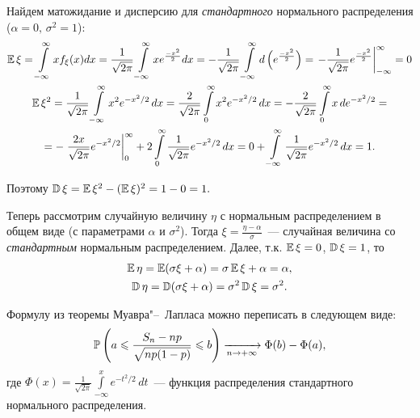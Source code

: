 Найдем матожидание и дисперсию для \textit{стандартного} нормального распределения ($\alpha = 0, \, \sigma^2 = 1$):
\begin{multline*}
    \operatorname{\mathbb{E}} \xi = 
    \int\limits_{-\infty}^{\infty} x f_{\xi}(x) dx =
    \frac{1}{\sqrt{2\pi}} \int\limits_{-\infty}^{\infty} x e^{\frac{-x^2}{2}} dx =
    -\frac{1}{\sqrt{2\pi}} \int\limits_{-\infty}^{\infty} d\left( e^{\frac{-x^2}{2}}\right) =
    \left. -\frac{1}{\sqrt{2\pi}} e^{\frac{-x^2}{2}}\right|_{-\infty}^{\infty} = 0 \\
    \operatorname{\mathbb{E}} \xi^{2}=\frac{1}{\sqrt{2 \pi}} \int\limits_{-\infty}^{\infty} x^{2} e^{-x^{2} / 2} \,d x=\frac{2}{\sqrt{2 \pi}} \int\limits_{0}^{\infty} x^{2} e^{-x^{2} / 2} \,d x=-\frac{2}{\sqrt{2 \pi}} \int\limits_{0}^{\infty} x \,d e^{-x^{2} / 2}= \\
    =-\left.\frac{2 x}{\sqrt{2 \pi}} e^{-x^{2} / 2}\right|_{0} ^{\infty}+2 \int\limits_{0}^{\infty} \frac{1}{\sqrt{2 \pi}} e^{-x^{2} / 2} \,d x=0+\int\limits_{-\infty}^{\infty} \frac{1}{\sqrt{2 \pi}} e^{-x^{2} / 2} \,d x=1.
\end{multline*}

Поэтому $\operatorname{\mathbb{D}}\xi = \operatorname{\mathbb{E}} \xi^2 - (\operatorname{\mathbb{E}} \xi)^2 = 1 - 0 = 1.$

Теперь рассмотрим случайную величину $\eta$ с нормальным распределением в общем виде (с параметрами $\alpha$ и $\sigma^2$). Тогда $\xi = \frac{\eta - \alpha}{\sigma}$~--- случайная величина со \textit{стандартным} нормальным распределением. Далее, т.к. $\operatorname{\mathbb{E}} \xi = 0$, $\operatorname{\mathbb{D}}\xi = 1$, то
\begin{gather*}
    \operatorname{\mathbb{E}} \eta = \operatorname{\mathbb{E}} (\sigma \xi + \alpha) = \sigma \operatorname{\mathbb{E}} \xi + \alpha = \alpha, \\
    \operatorname{\mathbb{D}}\eta = \operatorname{\mathbb{D}}(\sigma \xi + \alpha) = \sigma^2 \operatorname{\mathbb{D}}\xi = \sigma^2.
\end{gather*}

\vspace{1cm}
\begin{rmrk}
Формулу из теоремы Муавра"--~Лапласа можно переписать в следующем виде:
\begin{equation*}
    \operatorname{\mathbb{P}}\left(a \leqslant \frac{S_{n}-n p}{\sqrt{n p(1-p)}} \leqslant b\right) \xrightarrow[n \to +\infty]{} \Phi(b) - \Phi(a),
\end{equation*}
где $\Phi(x)=\frac{1}{\sqrt{2 \pi}} \int\limits_{-\infty}^{x} e^{-t^{2} / 2} \,d t$~--- функция распределения стандартного нормального распределения.
\end{rmrk}